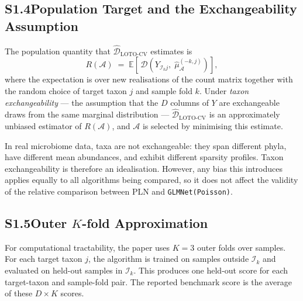 \subsection*{S1.4\quad Population Target and the Exchangeability Assumption}

The population quantity that $\widehat{\mathcal{D}}_{\mathrm{LOTO}\text{-}\mathrm{CV}}$ estimates is
\[
  R(\mathcal{A})
  \;=\;
  \mathbb{E}\!\left[\,\mathcal{D}\!\left(Y_{\mathcal{I}_k j},\; \hat{\mu}^{(-k,j)}_{\mathcal{A}}\right)\right],
\]
where the expectation is over new realisations of the count matrix together with the random choice of target taxon $j$ and sample fold $k$.
Under \emph{taxon exchangeability} --- the assumption that the $D$ columns of $Y$ are exchangeable draws from the same marginal distribution --- $\widehat{\mathcal{D}}_{\mathrm{LOTO}\text{-}\mathrm{CV}}$ is an approximately unbiased estimator of $R(\mathcal{A})$, and $\mathcal{A}$ is selected by minimising this estimate.

In real microbiome data, taxa are not exchangeable: they span different phyla, have different mean abundances, and exhibit different sparsity profiles.
Taxon exchangeability is therefore an idealisation.
However, any bias this introduces applies equally to all algorithms being compared, so it does not affect the validity of the relative comparison between PLN and \texttt{GLMNet(Poisson)}.

\subsection*{S1.5\quad Outer $K$-fold Approximation}

For computational tractability, the paper uses $K = 3$ outer folds over samples.
For each target taxon $j$, the algorithm is trained on samples outside $\mathcal{I}_k$ and evaluated on held-out samples in $\mathcal{I}_k$.
This produces one held-out score for each target-taxon and sample-fold pair.
The reported benchmark score is the average of these $D \times K$ scores.

\clearpage
